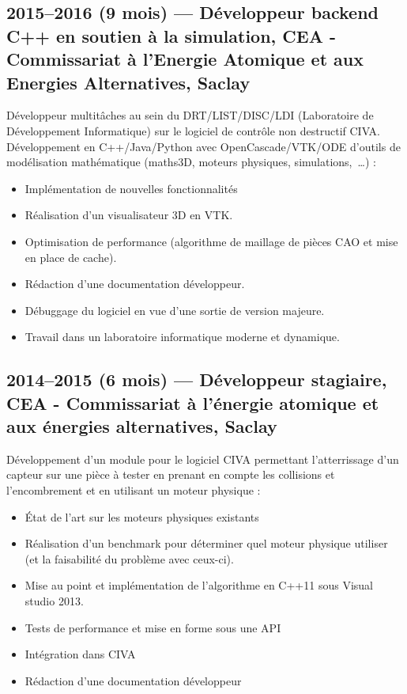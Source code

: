 \documentclass[11pt,a4paper,sans]{article} %
\begin{document}
\subsection{2015--2016 (9 mois) --- Développeur backend C++ en soutien à la simulation, CEA - Commissariat à l'Energie
  Atomique et aux Energies Alternatives, Saclay}
Développeur multitâches au sein du DRT/LIST/DISC/LDI (Laboratoire de Développement Informatique) sur le logiciel de
contrôle non destructif CIVA.
Développement en C++/Java/Python avec OpenCascade/VTK/ODE d'outils de modélisation mathématique (maths3D, moteurs
physiques, simulations,~\ldots) :
\begin{itemize}
  \item Implémentation de nouvelles fonctionnalités
  \item Réalisation d'un visualisateur 3D en VTK.
  \item Optimisation de performance (algorithme de maillage de pièces CAO et mise en place de cache).
  \item Rédaction d'une documentation développeur.
  \item Débuggage du logiciel en vue d'une sortie de version majeure.
  \item Travail dans un laboratoire informatique moderne et dynamique.
\end{itemize}

\subsection{2014--2015 (6 mois) --- Développeur stagiaire, CEA - Commissariat à l'énergie atomique et aux énergies
  alternatives, Saclay}
Développement d'un module pour le logiciel CIVA permettant l'atterrissage d'un capteur sur une pièce à tester en prenant
en compte les collisions et l'encombrement et en utilisant un moteur physique :
\begin{itemize}
  \item \'{E}tat de l'art sur les moteurs physiques existants
  \item Réalisation d'un benchmark pour déterminer quel moteur physique utiliser (et la faisabilité du problème avec
        ceux-ci).
  \item Mise au point et implémentation de l'algorithme en C++11 sous Visual studio 2013.
  \item Tests de performance et mise en forme sous une API
  \item Intégration dans CIVA
  \item Rédaction d'une documentation développeur
\end{itemize}
\end{document}
